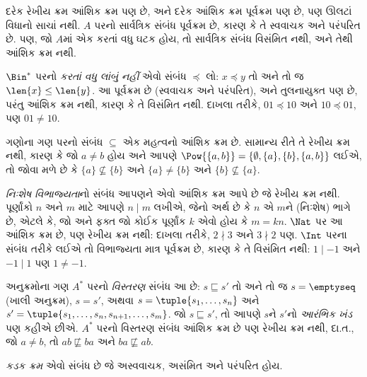 \begin{ex}
દરેક રેખીય ક્રમ આંશિક ક્રમ પણ છે, અને દરેક આંશિક ક્રમ
પૂર્વક્રમ પણ છે, પણ ઊલટાં વિધાનો સાચાં નથી.
$A$ પરનો સાર્વત્રિક સંબંધ પૂર્વક્રમ છે, કારણ કે તે સ્વવાચક
અને પરંપરિત છે. પણ, જો $A$માં એક કરતાં વધુ ઘટક
હોય, તો સાર્વત્રિક સંબંધ વિસંમિત નથી, અને તેથી આંશિક ક્રમ નથી.
\end{ex}

\begin{ex}
$\Bin^*$ પરનો \emph{કરતાં વધુ લાંબું નહીં} એવો સંબંધ
$\preccurlyeq$ લો: $x \preccurlyeq y$ તો અને તો જ
$\len{x} \le \len{y}$. આ પૂર્વક્રમ છે (સ્વવાચક અને પરંપરિત),
અને તુલનાયુક્ત પણ છે, પરંતુ આંશિક ક્રમ નથી,
કારણ કે તે વિસંમિત નથી. દાખલા તરીકે,
$01 \preccurlyeq 10$ અને $10 \preccurlyeq 01$,
પણ $01 \neq 10$.
\end{ex}

\begin{ex}
ગણોના ગણ પરનો સંબંધ $\subseteq$ એક મહત્વનો આંશિક ક્રમ છે.
સામાન્ય રીતે તે રેખીય ક્રમ નથી, કારણ કે જો $a \neq b$ હોય
અને આપણે $\Pow{\{a, b\}} = \{\emptyset, \{a\}, \{b\}, \{a,b\}\}$
લઈએ, તો જોવા મળે છે કે $\{a\} \nsubseteq \{b\}$ અને
$\{a\} \neq \{b\}$ અને $\{b\} \nsubseteq \{a\}$.
\end{ex}

\begin{ex}
\emph{નિઃશેષ વિભાજ્યતા}નો સંબંધ આપણને એવો આંશિક ક્રમ આપે છે
જે રેખીય ક્રમ નથી. પૂર્ણાંકો $n$ અને $m$ માટે આપણે $n \mid m$
લખીએ, જેનો અર્થ છે કે $n$ એ $m$ને (નિઃશેષ) ભાગે છે,
એટલે કે, જો અને ફક્ત જો કોઈક પૂર્ણાંક $k$ એવો હોય કે
$m = kn$. $\Nat$ પર આ આંશિક ક્રમ છે, પણ રેખીય ક્રમ નથી:
દાખલા તરીકે, $2 \nmid 3$ અને $3 \nmid 2$ પણ.
$\Int$ પરના સંબંધ તરીકે લઈએ તો વિભાજ્યતા માત્ર પૂર્વક્રમ છે,
કારણ કે તે વિસંમિત નથી: $1 \mid -1$ અને $-1 \mid 1$
પણ $1 \neq -1$.
\end{ex}

\begin{ex}
અનુક્રમોના ગણ $A^*$ પરનો \emph{વિસ્તરણ} સંબંધ આ છે:
$s \sqsubseteq s'$ તો અને તો જ $s = \emptyseq$ (ખાલી અનુક્રમ),
$s = s'$, અથવા $s = \tuple{s_1, \dots, s_n}$ અને
$s' = \tuple{s_1, \dots, s_n, s_{n+1}, \dots, s_m}$.
જો $s \sqsubseteq s'$, તો આપણે $s$ને $s'$નો
\emph{આરંભિક ખંડ} પણ કહીએ છીએ.
$A^*$ પરનો વિસ્તરણ સંબંધ આંશિક ક્રમ છે પણ રેખીય ક્રમ નથી,
દા.ત., જો $a \neq b$, તો $ab \not\sqsubseteq ba$ અને
$ba \not\sqsubseteq ab$.
\end{ex}

\begin{defn}[કડક ક્રમ]
\emph{કડક ક્રમ} એવો સંબંધ છે જે અસ્વવાચક, અસંમિત અને પરંપરિત હોય.
\end{defn}

